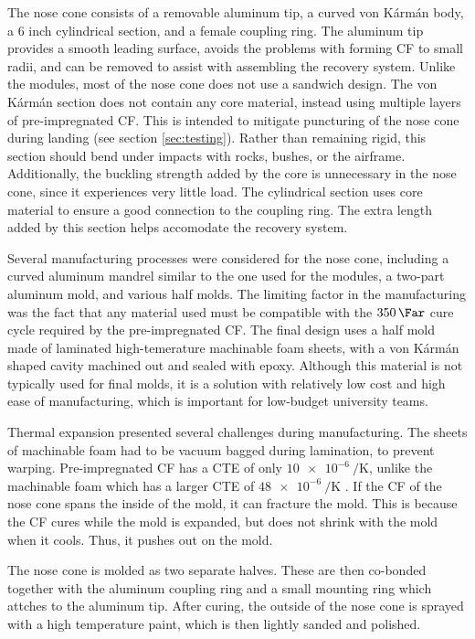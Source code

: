 \documentclass{aiaa-tc}%
\begin{document}
The nose cone consists of a removable aluminum tip, a curved von K\'arm\'an body, a 6 inch cylindrical section, and a female coupling ring. 
The aluminum tip provides a smooth leading surface, avoids the problems with forming CF to small radii, and can be removed to assist with assembling the recovery system. 
Unlike the modules, most of the nose cone does not use a sandwich design.
The von K\'arm\'an section does not contain any core material, instead using multiple layers of pre-impregnated CF. 
This is intended to mitigate puncturing of the nose cone during landing (see section \ref{sec:testing}). 
Rather than remaining rigid, this section should bend under impacts with rocks, bushes, or the airframe. 
Additionally, the buckling strength added by the core is unnecessary in the nose cone, since it experiences very little load.
The cylindrical section uses core material to ensure a good connection to the coupling ring. 
The extra length added by this section helps accomodate the recovery system. 

Several manufacturing processes were considered for the nose cone, including a curved aluminum mandrel similar to the one used for the modules, a two-part aluminum mold, and various half molds. 
The limiting factor in the manufacturing was the fact that any material used must be compatible with the $\SI{350}{\Far}$ cure cycle required by the pre-impregnated CF. 
The final design uses a half mold made of laminated high-temerature machinable foam sheets, with a von K\'arm\'an shaped cavity machined out and sealed with epoxy. 
Although this material is not typically used for final molds, it is a solution with relatively low cost and high ease of manufacturing, which is important for low-budget university teams.

Thermal expansion presented several challenges during manufacturing. 
The sheets of machinable foam had to be vacuum bagged during lamination, to prevent warping.
Pre-impregnated CF has a CTE of only $\SI{10e-6}{\per\kelvin}$, unlike the machinable foam which has a larger CTE of $\SI{48e-6}{\per\kelvin}$ .
If the CF of the nose cone spans the inside of the mold, it can fracture the mold. 
This is because the CF cures while the mold is expanded, but does not shrink with the mold when it cools. Thus, it pushes out on the mold. 

The nose cone is molded as two separate halves. These are then co-bonded together with the aluminum coupling ring and a small mounting ring which attches to the aluminum tip.
After curing, the outside of the nose cone is sprayed with a high temperature paint, which is then lightly sanded and polished.
\end{document}
